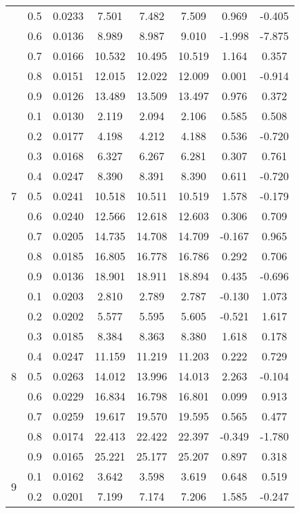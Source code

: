 \documentclass[11pt,a4paper]{report}
\begin{document}
\begin{longtable}{ | c | c || c | c | c | c | c | c | }
 & 0.5 & 0.0233 & 7.501 & 7.482 & 7.509 & 0.969 & -0.405 \\
 & 0.6 & 0.0136 & 8.989 & 8.987 & 9.010 & -1.998 & -7.875 \\
 & 0.7 & 0.0166 & 10.532 & 10.495 & 10.519 & 1.164 & 0.357 \\
 & 0.8 & 0.0151 & 12.015 & 12.022 & 12.009 & 0.001 & -0.914 \\
 & 0.9 & 0.0126 & 13.489 & 13.509 & 13.497 & 0.976 & 0.372 \\
 \hline
\multirow{9}{*}{7} & 0.1 & 0.0130 & 2.119 & 2.094 & 2.106 & 0.585 & 0.508 \\
 & 0.2 & 0.0177 & 4.198 & 4.212 & 4.188 & 0.536 & -0.720 \\
 & 0.3 & 0.0168 & 6.327 & 6.267 & 6.281 & 0.307 & 0.761 \\
 & 0.4 & 0.0247 & 8.390 & 8.391 & 8.390 & 0.611 & -0.720 \\
 & 0.5 & 0.0241 & 10.518 & 10.511 & 10.519 & 1.578 & -0.179 \\
 & 0.6 & 0.0240 & 12.566 & 12.618 & 12.603 & 0.306 & 0.709 \\
 & 0.7 & 0.0205 & 14.735 & 14.708 & 14.709 & -0.167 & 0.965 \\
 & 0.8 & 0.0185 & 16.805 & 16.778 & 16.786 & 0.292 & 0.706 \\
 & 0.9 & 0.0136 & 18.901 & 18.911 & 18.894 & 0.435 & -0.696 \\
 \hline
\multirow{9}{*}{8} & 0.1 & 0.0203 & 2.810 & 2.789 & 2.787 & -0.130 & 1.073 \\
 & 0.2 & 0.0202 & 5.577 & 5.595 & 5.605 & -0.521 & 1.617 \\
 & 0.3 & 0.0185 & 8.384 & 8.363 & 8.380 & 1.618 & 0.178 \\
 & 0.4 & 0.0247 & 11.159 & 11.219 & 11.203 & 0.222 & 0.729 \\
 & 0.5 & 0.0263 & 14.012 & 13.996 & 14.013 & 2.263 & -0.104 \\
 & 0.6 & 0.0229 & 16.834 & 16.798 & 16.801 & 0.099 & 0.913 \\
 & 0.7 & 0.0259 & 19.617 & 19.570 & 19.595 & 0.565 & 0.477 \\
 & 0.8 & 0.0174 & 22.413 & 22.422 & 22.397 & -0.349 & -1.780 \\
 & 0.9 & 0.0165 & 25.221 & 25.177 & 25.207 & 0.897 & 0.318 \\
 \hline
\multirow{9}{*}{9} & 0.1 & 0.0162 & 3.642 & 3.598 & 3.619 & 0.648 & 0.519 \\
 & 0.2 & 0.0201 & 7.199 & 7.174 & 7.206 & 1.585 & -0.247 \\

\end{longtable}
\end{document}
